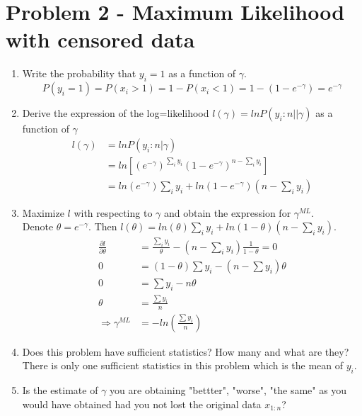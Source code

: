 \documentclass[preprint,12pt]{elsarticle}
\begin{document}
    \section{Problem 2 - Maximum Likelihood with censored data}
    \begin{enumerate}[label=\alph*]
        \item Write the probability that $y_i=1$ as a function of $\gamma$.
        \begin{equation*}
            P(y_i=1) = P(x_i>1) = 1 - P(x_i<1) = 1 - (1-e^{-\gamma})=e^{-\gamma}
        \end{equation*}

        \item Derive the expression of the log=likelihood $l(\gamma)=ln P(y_i:n||\gamma)$
        as a function of $\gamma$
        \begin{align*}
            l(\gamma) &= ln P(y_i:n|\gamma) \\
                &= ln[(e^{-\gamma})^{\sum_{i}y_i}(1-e^{-\gamma})^{n-\sum_{i}y_i}]\\
                &= ln(e^{-\gamma})\sum_{i}y_i + ln(1-e^{-\gamma})(n-\sum_{i}y_i)
        \end{align*}

        \item Maximize $l$ with respecting to $\gamma$ and obtain the expression for
        $\gamma^{ML}$.\\
        Denote $\theta=e^{-\gamma}$. Then $l(\theta) = ln(\theta)\sum_{i}y_i + ln(1-\theta)(n-\sum_{i}y_i)$.
        \begin{align*}
            \frac{\partial l}{\partial \theta} &= \frac{\sum_{i}y_i}{\theta} - (n-\sum_{i}y_i)\frac{1}{1-\theta} = 0\\
            0 &= (1-\theta)\sum y_i - (n-\sum y_i)\theta \\
            0 &= \sum y_i - n\theta\\
            \theta &= \frac{\sum y_i}{n}\\
            \Rightarrow \gamma^{ML} &= -ln(\frac{\sum y_i}{n})
        \end{align*}

        \item Does this problem have sufficient statistics? How many and what are they?\\

        There is only one sufficient statistics in this problem which is the mean of $y_i$.

        \item Is the estimate of $\gamma$ you are obtaining "bettter", "worse", "the same"
        as you would have obtained had you not lost the original data $x_{1:n}$?\\


\end{enumerate}
\end{document}
